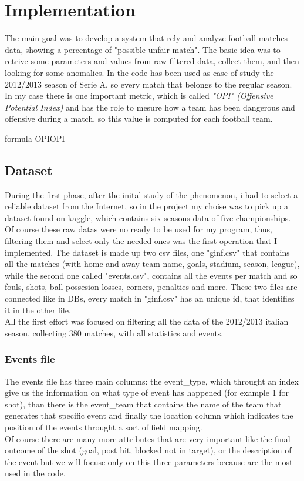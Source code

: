 \documentclass[a4paper,titlepage,11pt]{report}
\begin{document}
{\chapter{
Implementation}
The main goal was to develop a system that rely and analyze football matches data, showing a percentage of "possible unfair match". The basic idea was to retrive some parameters and values from raw filtered data, collect them, and then looking for some anomalies. In the code has been used as case of study the 2012/2013 season of Serie A, so every match that belongs to the regular season. In my case there is one important metric, which is called \textit{"OPI" (Offensive Potential Index)} and has the role to mesure how a team has been dangerous and offensive during a match, so this value is computed for each football team. 

formula OPIOPI

\section{
Dataset}
During the first phase, after the inital study of the phenomenon, i had to select a reliable dataset from the Internet, so in the project my choise was to pick up a dataset found on kaggle, which contains six seasons data of five championships. Of course these raw datas were no ready to be used for my program, thus, filtering them and select only the needed ones was the first operation that I implemented. The dataset is made up two csv files, one "ginf.csv" that contains all the matches (with home and away team name, goals, stadium, season, league), while the second one called "events.csv", contains all the events per match and so fouls, shots, ball possesion losses, corners, penalties and more. These two files are connected like in DBs, every match in "ginf.csv"  has an unique id, that identifies it in the other file.\\
All the first effort was focused on filtering all the data of the 2012/2013 italian season, collecting 380 matches, with all statistics and events. 

\subsection{
Events file}
The events file has three main columns: the event\_type, which throught an index give us the information on what type of event has happened (for example 1 for shot), than there is the event\_team that contains the name of the team that generates that specific event and finally the location column which indicates the position of the events throught a sort of field mapping.\\
Of course there are many more attributes that are very important like the final outcome of the shot (goal, post hit, blocked not in target), or the description of the event but we will focuse only on this three parameters because are the most used in the code.

}
\end{document}

